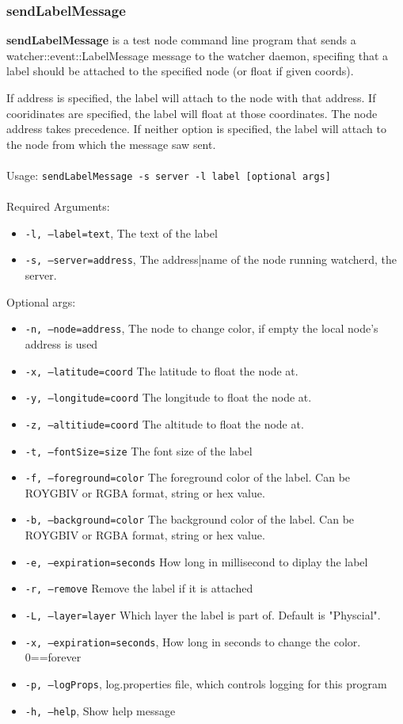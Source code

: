 \newpage
\label{sendLabelMessage}
\subsubsection{sendLabelMessage}
{\bf sendLabelMessage} is a test node command line program that sends a watcher::event::LabelMessage message to the watcher daemon, specifing that a label should be attached to the specified node (or float if given coords).

If address is specified, the label will attach to the node with that address. If cooridinates are
specified, the label will float at those coordinates. The node address takes precedence. If neither
option is specified, the label will attach to the node from which the message saw sent.
\\\\
Usage: 
{\tt sendLabelMessage -s server -l label [optional args]}
\\\\
Required Arguments:
\begin{itemize}
\item {\tt -l, --label=text}, The text of the label
\item {\tt -s, --server=address}, The address|name of the node running watcherd, the server.
\end{itemize}
Optional args:
\begin{itemize}
\item {\tt -n, --node=address}, The node to change color, if empty the local node's address is used
\item {\tt -x, --latitude=coord}        The latitude to float the node at.
\item {\tt -y, --longitude=coord}       The longitude to float the node at.
\item {\tt -z, --altitiude=coord}       The altitude to float the node at.
\item {\tt -t, --fontSize=size}         The font size of the label
\item {\tt -f, --foreground=color}      The foreground color of the label. Can be ROYGBIV or RGBA format, string or hex value.
\item {\tt -b, --background=color}      The background color of the label. Can be ROYGBIV or RGBA format, string or hex value.
\item {\tt -e, --expiration=seconds}    How long in millisecond to diplay the label
\item {\tt -r, --remove}                Remove the label if it is attached
\item {\tt -L, --layer=layer}           Which layer the label is part of. Default is "Physcial".
\item {\tt -x, --expiration=seconds}, How long in seconds to change the color. 0==forever
\item {\tt -p, --logProps}, log.properties file, which controls logging for this program
\item {\tt -h, --help}, Show help message
\end{itemize}
